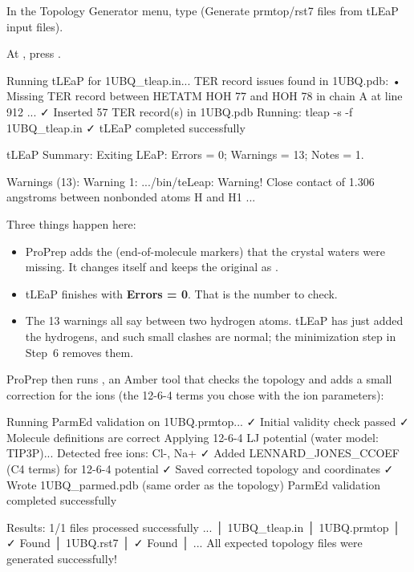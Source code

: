 \begin{steps}
  \item In the Topology Generator menu, type  (Generate prmtop/rst7
        files from tLEaP input files).
  \item At , press .
\end{steps}

\begin{screen}
Running tLEaP for 1UBQ_tleap.in...
TER record issues found in 1UBQ.pdb:
  • Missing TER record between HETATM HOH 77 and HOH 78 in chain A at line 912
...
✓ Inserted 57 TER record(s) in 1UBQ.pdb
Running: tleap -s -f 1UBQ_tleap.in
✓ tLEaP completed successfully

tLEaP Summary: Exiting LEaP: Errors = 0; Warnings = 13; Notes = 1.

Warnings (13):
Warning 1:
  .../bin/teLeap: Warning!
  Close contact of 1.306 angstroms between nonbonded atoms H and H1
...
\end{screen}

Three things happen here:

\begin{itemize}
  \item ProPrep adds the  (end-of-molecule markers) that the
        crystal waters were missing. It changes  itself and
        keeps the original as .
  \item tLEaP finishes with \textbf{Errors = 0}. That is the number to check.
  \item The 13 warnings all say  between two hydrogen
        atoms. tLEaP has just added the hydrogens, and such small clashes are
        normal; the minimization step in Step~6 removes them.
\end{itemize}

ProPrep then runs , an Amber tool that checks the topology and
adds a small correction for the ions (the 12-6-4 terms you chose with the ion
parameters):

\begin{screen}
Running ParmEd validation on 1UBQ.prmtop...
  ✓ Initial validity check passed
  ✓ Molecule definitions are correct
  Applying 12-6-4 LJ potential (water model: TIP3P)...
  Detected free ions: Cl-, Na+
  ✓ Added LENNARD_JONES_CCOEF (C4 terms) for 12-6-4 potential
  ✓ Saved corrected topology and coordinates
  ✓ Wrote 1UBQ_parmed.pdb (same order as the topology)
ParmEd validation completed successfully

Results: 1/1 files processed successfully
...
│ 1UBQ_tleap.in │ 1UBQ.prmtop     │ ✓ Found       │ 1UBQ.rst7     │ ✓ Found     │
...
All expected topology files were generated successfully!
\end{screen}

